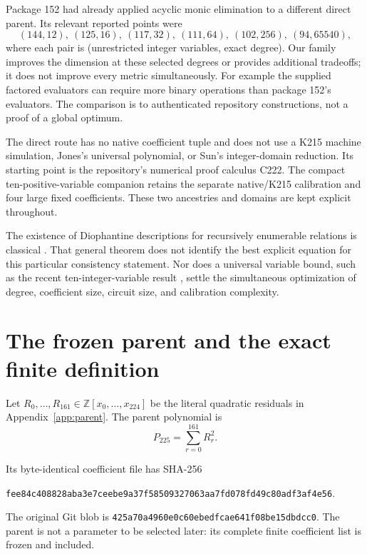 \documentclass[11pt]{article}
\theoremstyle{definition}\newtheorem{definition}[theorem]{Definition}
\theoremstyle{remark}\newtheorem{remark}[theorem]{Remark}
\newcommand{\Z}{\mathbb Z}
\begin{document}
Package 152 had already applied acyclic monic elimination to a different
direct parent. Its relevant reported points were
\[
(144,12),\ (125,16),\ (117,32),\ (111,64),\ (102,256),\ (94,65540),
\]
where each pair is (unrestricted integer variables, exact degree).
Our family improves the dimension at these selected degrees or provides
additional tradeoffs; it does not improve every metric simultaneously.
For example the supplied factored evaluators can require more binary
operations than package 152's evaluators. The comparison is to authenticated
repository constructions, not a proof of a global optimum.

The direct route has no native coefficient tuple and does not use a K215
machine simulation, Jones's universal polynomial, or Sun's integer-domain
reduction. Its starting point is the repository's numerical proof calculus
C222. The compact ten-positive-variable companion retains the separate
native/K215 calibration and four large fixed coefficients. These two
ancestries and domains are kept explicit throughout.

The existence of Diophantine descriptions for recursively enumerable
relations is classical \cite{matiyasevich,matbook}. That general theorem
does not identify the best explicit equation for this particular
consistency statement. Nor does a universal variable bound, such as the
recent ten-integer-variable result \cite{sun}, settle the simultaneous
optimization of degree, coefficient size, circuit size, and calibration
complexity.

\section{The frozen parent and the exact finite definition}
\label{sec:definition}

Let $R_0,\ldots,R_{161}\in\Z[x_0,\ldots,x_{224}]$ be the literal
quadratic residuals in Appendix~\ref{app:parent}. The parent polynomial is
\[
P_{225}=\sum_{r=0}^{161}R_r^2.
\]
\begin{samepage}
Its byte-identical coefficient file has SHA-256
\begin{center}\scriptsize\texttt{fee84c408828aba3e7ceebe9a37f58509327063aa7fd078fd49c80adf3af4e56}.\end{center}
The original Git blob is
\texttt{425a70a4960e0c60ebedfcae641f08be15dbdcc0}.
The parent is not a parameter to be selected later: its complete finite
coefficient list is frozen and included.
\end{samepage}
\end{document}
